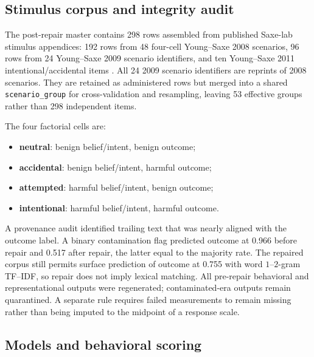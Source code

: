 \subsection{Stimulus corpus and integrity audit}

The post-repair master contains 298 rows assembled from published Saxe-lab stimulus appendices: 192 rows from 48 four-cell Young--Saxe 2008 scenarios, 96 rows from 24 Young--Saxe 2009 scenario identifiers, and ten Young--Saxe 2011 intentional/accidental items \citep{young2008belief,young2009innocent,young2011ignorance}.
All 24 2009 scenario identifiers are reprints of 2008 scenarios.
They are retained as administered rows but merged into a shared \texttt{scenario\_group} for cross-validation and resampling, leaving 53 effective groups rather than 298 independent items.

The four factorial cells are:
\begin{itemize}[leftmargin=*]
    \item \textbf{neutral}: benign belief/intent, benign outcome;
    \item \textbf{accidental}: benign belief/intent, harmful outcome;
    \item \textbf{attempted}: harmful belief/intent, benign outcome;
    \item \textbf{intentional}: harmful belief/intent, harmful outcome.
\end{itemize}

A provenance audit identified trailing text that was nearly aligned with the outcome label.
A binary contamination flag predicted outcome at 0.966 before repair and 0.517 after repair, the latter equal to the majority rate.
The repaired corpus still permits surface prediction of outcome at 0.755 with word $1$--$2$-gram TF--IDF, so repair does not imply lexical matching.
All pre-repair behavioral and representational outputs were regenerated; contaminated-era outputs remain quarantined.
A separate rule requires failed measurements to remain missing rather than being imputed to the midpoint of a response scale.

\subsection{Models and behavioral scoring}

